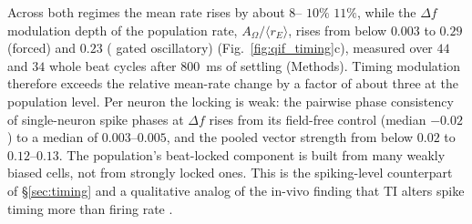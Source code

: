 \documentclass[11pt,a4paper]{article}
\providecommand{\DIFaddtex}[1]{{\protect\color{blue} \sf #1}} %
\providecommand{\DIFdeltex}[1]{{\protect\color{red} \scriptsize #1}} %
\providecommand{\DIFaddbegin}{} %
\providecommand{\DIFaddend}{} %
\providecommand{\DIFdelbegin}{} %
\providecommand{\DIFdelend}{} %
\providecommand{\DIFadd}[1]{\texorpdfstring{\DIFaddtex{#1}}{#1}} %
\providecommand{\DIFdel}[1]{\texorpdfstring{\DIFdeltex{#1}}{}} %
\begin{document}
Across both regimes the mean rate rises by \DIFaddbegin \DIFadd{about }\DIFaddend $8$--\DIFdelbegin \DIFdel{$10\%$}\DIFdelend \DIFaddbegin \DIFadd{$11\%$}\DIFaddend , while the $\Delta f$ modulation depth of the
population rate, $A_\Omega/\langle r_E\rangle$, rises from below $0.003$ to $0.29$ (forced)
and $0.23$ (\DIFdelbegin \DIFdel{gated}\DIFdelend \DIFaddbegin \DIFadd{oscillatory}\DIFaddend ) (Fig.~\ref{fig:qif_timing}c), measured over $44$ and $34$ whole beat
cycles after $800$~ms of settling (Methods). Timing modulation therefore exceeds the
relative mean-rate change by a factor of about three at the population level. Per neuron
the locking is weak: the pairwise phase consistency of single-neuron spike phases at
$\Delta f$ rises from its field-free control (median $-0.02$) to a median of
$0.003$--$0.005$, and the pooled vector strength from below $0.02$ to $0.12$--$0.13$. The
population's beat-locked component is built from many weakly biased cells, not from
strongly locked ones. This is the spiking-level counterpart of \S\ref{sec:timing} and a
qualitative analog of the in-vivo finding that TI alters spike timing more than firing
rate \cite{vieira2024}.
\end{document}
